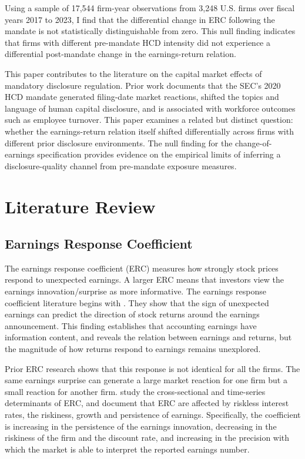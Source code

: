 \documentclass[12pt]{article}
\begin{document}
{Using a sample of 17{,}544 firm-year observations from 3{,}248 U.S. firms over fiscal years 2017 to 2023, I find that the differential change in ERC following the mandate is not statistically distinguishable from zero. This null finding indicates that firms with different pre-mandate HCD intensity did not experience a differential post-mandate change in the earnings-return relation.}

{This paper contributes to the literature on the capital market effects of mandatory disclosure regulation. Prior work documents that the SEC's 2020 HCD mandate generated filing-date market reactions, shifted the topics and language of human capital disclosure, and is associated with workforce outcomes such as employee turnover. This paper examines a related but distinct question: whether the earnings-return relation itself shifted differentially across firms with different prior disclosure environments. The null finding for the change-of-earnings specification provides evidence on the empirical limits of inferring a disclosure-quality channel from pre-mandate exposure measures.}

\section{Literature Review}

\subsection{Earnings Response Coefficient}

The earnings response coefficient (ERC) measures how strongly stock prices respond to unexpected earnings. A larger ERC means that investors view the earnings innovation/surprise as more informative. The earnings response coefficient literature begins with \citet{ballBrown1968}. They show that the sign of unexpected earnings can predict the direction of stock returns around the earnings announcement. This finding establishes that accounting earnings have information content, and reveals the relation between earnings and returns, but the magnitude of how returns respond to earnings remains unexplored.

Prior ERC research shows that this response is not identical for all the firms. The same earnings surprise can generate a large market reaction for one firm but a small reaction for another firm. \citet{collinsKothari1989} study the cross-sectional and time-series determinants of ERC, and document that ERC are affected by riskless interest rates, the riskiness, growth and persistence of earnings. Specifically, the coefficient is increasing in the persistence of the earnings innovation, decreasing in the riskiness of the firm and the discount rate, and increasing in the precision with which the market is able to interpret the reported earnings number.
\end{document}
